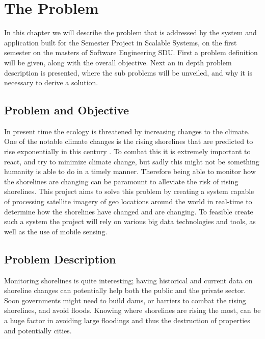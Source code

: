 \chapter{The Problem}

In this chapter we will describe the problem that is addressed by the system and application built for the Semester Project in Scalable Systems, on the first semester on the masters of Software Engineering SDU. \medbreak
\noindent
First a problem definition will be given, along with the overall objective. Next an in depth problem description is presented, where the sub problems will be unveiled, and why it is necessary to derive a solution.

\section{Problem and Objective}

In present time the ecology is threatened by increasing changes to the climate. One of the notable climate changes is the rising shorelines that are predicted to rise exponentially in this century . To combat this it is extremely important to react, and try to minimize climate change, but sadly this might not be something humanity is able to do in a timely manner. Therefore being able to monitor how the shorelines are changing can be paramount to alleviate the risk of rising shorelines. \medbreak 
\noindent
This project aims to solve this problem by creating a system capable of processing satellite imagery of geo locations around the world in real-time to determine how the shorelines have changed and are changing. \medbreak 
\noindent
To feasible create such a system the project will rely on various big data technologies and tools, as well as the use of mobile sensing.

\section{Problem Description} 

Monitoring shorelines is quite interesting; having historical and current data on shoreline changes can potentially help both the public and the private sector.  \medbreak 
\noindent
Soon governments might need to build dams, or barriers to combat the rising shorelines, and avoid floods. Knowing where shorelines are rising the most, can be a huge factor in avoiding large floodings and thus the destruction of properties and potentially cities.

